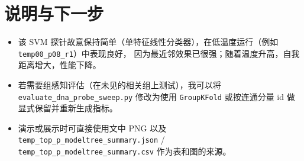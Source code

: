 \documentclass[11pt,a4paper]{article}
\begin{document}
\section{说明与下一步}
\begin{itemize}
  \item 该 SVM 探针故意保持简单（单特征线性分类器），在低温度运行（例如 \texttt{temp00\_p08\_r1}）中表现良好，
    因为最近邻效果已很强；随着温度升高，自我距离增大，性能下降。
  \item 若需要组感知评估（在未见的相关组上测试），我可以将 \texttt{evaluate\_dna\_probe\_sweep.py}
    修改为使用 \texttt{GroupKFold} 或按连通分量 id 做显式保留并重新生成指标。
  \item 演示或展示时可直接使用文中 PNG 以及 \texttt{temp\_top\_p\_modeltree\_summary.json}
    / \texttt{temp\_top\_p\_modeltree\_summary.csv} 作为表和图的来源。
\end{itemize}
\end{document}
